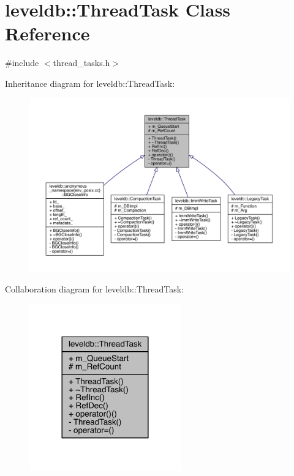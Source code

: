 \hypertarget{classleveldb_1_1_thread_task}{}\section{leveldb\+:\+:Thread\+Task Class Reference}
\label{classleveldb_1_1_thread_task}


{\ttfamily \#include $<$thread\+\_\+tasks.\+h$>$}



Inheritance diagram for leveldb\+:\+:Thread\+Task\+:
\nopagebreak
\begin{figure}[H]
\begin{center}
\leavevmode
\includegraphics[width=350pt]{classleveldb_1_1_thread_task__inherit__graph}
\end{center}
\end{figure}


Collaboration diagram for leveldb\+:\+:Thread\+Task\+:\nopagebreak
\begin{figure}[H]
\begin{center}
\leavevmode
\includegraphics[width=185pt]{classleveldb_1_1_thread_task__coll__graph}
\end{center}
\end{figure}
